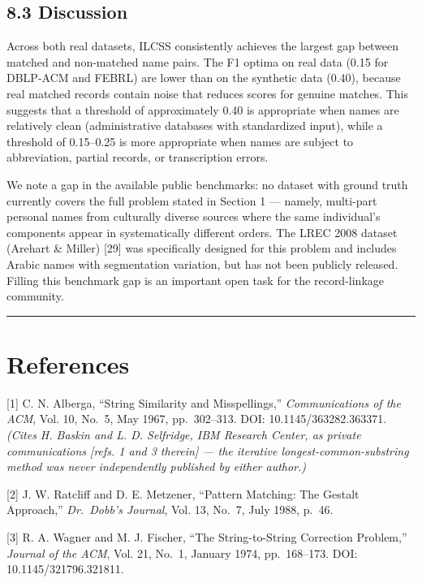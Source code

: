 \documentclass[
  11pt,
]{article}
\begin{document}
\subsection{8.3 Discussion}\label{discussion-1}

Across both real datasets, ILCSS consistently achieves the largest gap
between matched and non-matched name pairs. The F1 optima on real data
(0.15 for DBLP-ACM and FEBRL) are lower than on the synthetic data
(0.40), because real matched records contain noise that reduces scores
for genuine matches. This suggests that a threshold of approximately
0.40 is appropriate when names are relatively clean (administrative
databases with standardized input), while a threshold of 0.15--0.25 is
more appropriate when names are subject to abbreviation, partial
records, or transcription errors.

We note a gap in the available public benchmarks: no dataset with ground
truth currently covers the full problem stated in Section 1 --- namely,
multi-part personal names from culturally diverse sources where the same
individual's components appear in systematically different orders. The
LREC 2008 dataset (Arehart \& Miller) {[}29{]} was specifically designed
for this problem and includes Arabic names with segmentation variation,
but has not been publicly released. Filling this benchmark gap is an
important open task for the record-linkage community.

\begin{center}\rule{0.5\linewidth}{0.5pt}\end{center}

\section{References}\label{references}

{[}1{]} C. N. Alberga, ``String Similarity and Misspellings,''
\emph{Communications of the ACM}, Vol. 10, No.~5, May 1967,
pp.~302--313. DOI: 10.1145/363282.363371. \emph{(Cites H. Baskin and L.
D. Selfridge, IBM Research Center, as private communications {[}refs. 1
and 3 therein{]} --- the iterative longest-common-substring method was
never independently published by either author.)}

{[}2{]} J. W. Ratcliff and D. E. Metzener, ``Pattern Matching: The
Gestalt Approach,'' \emph{Dr.~Dobb's Journal}, Vol. 13, No.~7, July
1988, p.~46.

{[}3{]} R. A. Wagner and M. J. Fischer, ``The String-to-String
Correction Problem,'' \emph{Journal of the ACM}, Vol. 21, No.~1, January
1974, pp.~168--173. DOI: 10.1145/321796.321811.
\end{document}
